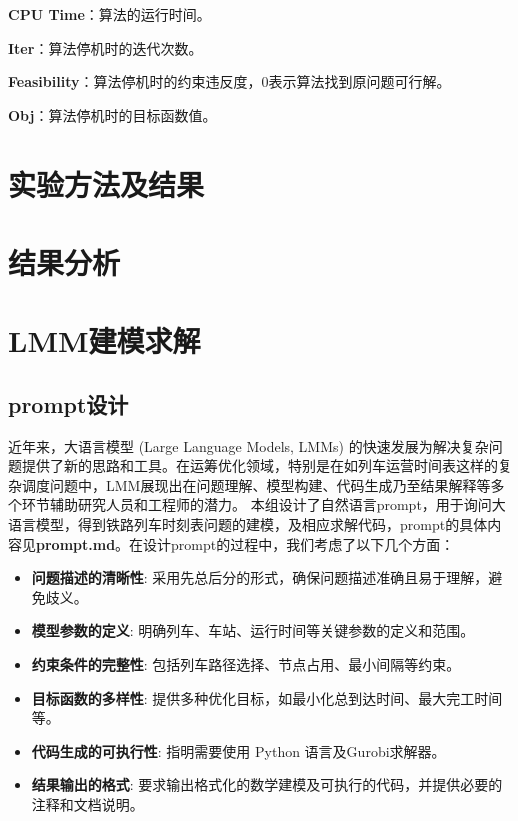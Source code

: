 \documentclass{article}
\begin{document}
    \textbf{CPU Time}：算法的运行时间。

    \textbf{Iter}：算法停机时的迭代次数。

    \textbf{Feasibility}：算法停机时的约束违反度，$0$表示算法找到原问题可行解。

    \textbf{Obj}：算法停机时的目标函数值。


    \section{实验方法及结果}


    \section{结果分析}


    \section{LMM建模求解}

    \subsection{prompt设计}
    近年来，大语言模型 (Large Language Models, LMMs) 的快速发展为解决复杂问题提供了新的思路和工具。在运筹优化领域，特别是在如列车运营时间表这样的复杂调度问题中，LMM展现出在问题理解、模型构建、代码生成乃至结果解释等多个环节辅助研究人员和工程师的潜力。
    本组设计了自然语言prompt，用于询问大语言模型，得到铁路列车时刻表问题的建模，及相应求解代码，prompt的具体内容见\textbf{prompt.md}。在设计prompt的过程中，我们考虑了以下几个方面：
    \begin{itemize}
        \item \textbf{问题描述的清晰性}: 采用先总后分的形式，确保问题描述准确且易于理解，避免歧义。
        \item \textbf{模型参数的定义}: 明确列车、车站、运行时间等关键参数的定义和范围。
        \item \textbf{约束条件的完整性}: 包括列车路径选择、节点占用、最小间隔等约束。
        \item \textbf{目标函数的多样性}: 提供多种优化目标，如最小化总到达时间、最大完工时间等。
        \item \textbf{代码生成的可执行性}: 指明需要使用 Python 语言及Gurobi求解器。
        \item \textbf{结果输出的格式}: 要求输出格式化的数学建模及可执行的代码，并提供必要的注释和文档说明。
    \end{itemize}
\end{document}
